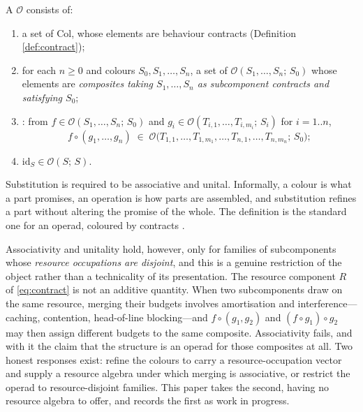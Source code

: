\begin{definition}\label{def:operad}
A  $\mathcal{O}$ consists of:
\begin{enumerate}[label=(\roman*)]
\item a set of  $\mathrm{Col}$, whose elements are behaviour contracts
      (Definition \ref{def:contract});
\item for each $n \ge 0$ and colours $S_0, S_1, \dots, S_n$, a set of 
      $\mathcal{O}(S_1, \dots, S_n;\, S_0)$ whose elements are \emph{composites taking
      $S_1,\dots,S_n$ as subcomponent contracts and satisfying $S_0$};
\item {}: from $f \in \mathcal{O}(S_1,\dots,S_n;\,S_0)$ and
      $g_i \in \mathcal{O}(T_{i,1},\dots,T_{i,m_i};\,S_i)$ for $i = 1..n$,
      \[
      f \circ (g_1, \dots, g_n) \;\in\;
      \mathcal{O}\bigl(T_{1,1},\dots,T_{1,m_1},\dots,T_{n,1},\dots,T_{n,m_n};\,S_0\bigr);
      \]
\item {} $\mathrm{id}_S \in \mathcal{O}(S;\,S)$.
\end{enumerate}
Substitution is required to be associative and unital. Informally, a colour is what a part
promises, an operation is how parts are assembled, and substitution refines a part without
altering the promise of the whole. The definition is the standard one for an operad,
coloured by contracts \cite{leinster2004}.

Associativity and unitality hold, however, only for families of subcomponents whose
\emph{resource occupations are disjoint}, and this is a genuine restriction of the object rather
than a technicality of its presentation. The resource component $R$ of \eqref{eq:contract} is not
an additive quantity. When two subcomponents draw on the same resource, merging their budgets
involves amortisation and interference---caching, contention, head-of-line blocking---and
$f \circ (g_1, g_2)$ and $(f \circ g_1) \circ g_2$ may then assign different budgets to the same
composite. Associativity fails, and with it the claim that the structure is an operad for those
composites at all. Two honest responses exist: refine the colours to carry a resource-occupation
vector and supply a resource algebra under which merging is associative, or restrict the operad to
resource-disjoint families. This paper takes the second, having no resource algebra to offer, and
records the first as work in progress.
\end{definition}

